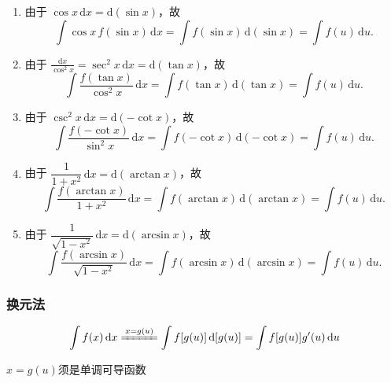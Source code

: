 \documentclass[a4paper,12pt]{article}
\begin{document}
\begin{enumerate}
        \item 由于 $\cos x\,\mathrm{d}x = \mathrm{d}(\sin x)$，故
        \[
            \int \cos x\,f(\sin x)\,\mathrm{d}x
            = \int f(\sin x)\,\mathrm{d}(\sin x)
            = \int f(u)\,\mathrm{d}u.
        \]

        \item 由于 $\displaystyle\frac{\mathrm{d}x}{\cos^2 x} = \sec^2 x\,\mathrm{d}x = \mathrm{d}(\tan x)$，故
        \[
            \int \frac{f(\tan x)}{\cos^2 x}\,\mathrm{d}x
            = \int f(\tan x)\,\mathrm{d}(\tan x)
            = \int f(u)\,\mathrm{d}u.
        \]

        \item 由于 $\csc^2 x\,\mathrm{d}x = \mathrm{d}(-\cot x)$，故
        \[
            \int \frac{f(-\cot x)}{\sin^2 x}\,\mathrm{d}x
            = \int f(-\cot x)\,\mathrm{d}(-\cot x)
            = \int f(u)\,\mathrm{d}u.
        \]

        \item 由于 $\dfrac{1}{1+x^2}\,\mathrm{d}x = \mathrm{d}(\arctan x)$，故
        \[
            \int \frac{f(\arctan x)}{1+x^2}\,\mathrm{d}x
            = \int f(\arctan x)\,\mathrm{d}(\arctan x)
            = \int f(u)\,\mathrm{d}u.
        \]

        \item 由于 $\dfrac{1}{\sqrt{1-x^2}}\,\mathrm{d}x = \mathrm{d}(\arcsin x)$，故
        \[
            \int \frac{f(\arcsin x)}{\sqrt{1-x^2}}\,\mathrm{d}x
            = \int f(\arcsin x)\,\mathrm{d}(\arcsin x)
            = \int f(u)\,\mathrm{d}u.
        \]

    \end{enumerate}

    \subsubsection{换元法}

    \[
        \int f(x)\,\mathrm{d}x \xlongequal{x = g(u)} \int f[g(u)]\,\mathrm{d}[g(u)] = \int f[g(u)]g'(u)\,\mathrm{d}u
    \]

    $x = g(u)$须是单调可导函数
\end{document}
